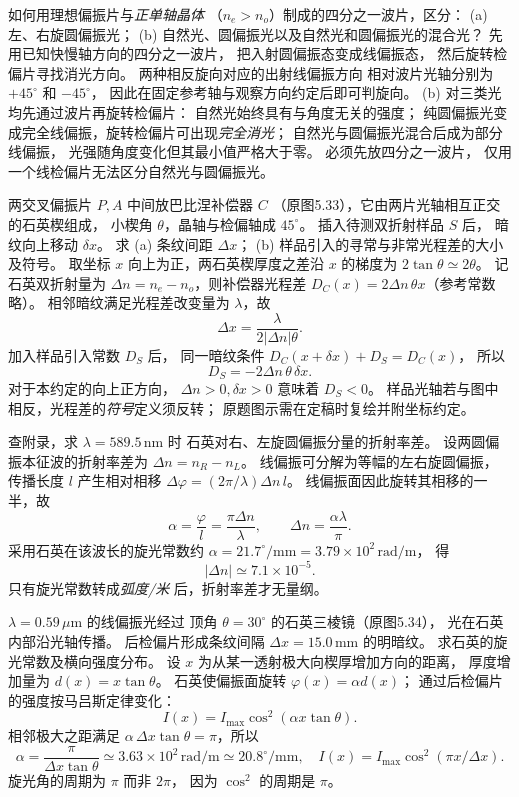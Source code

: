 如何用理想偏振片与\emph{正单轴晶体}
（$n_e>n_o$）制成的四分之一波片，区分：
(a) 左、右旋圆偏振光；
(b) 自然光、圆偏振光以及自然光和圆偏振光的混合光？
\exsolution
先用已知快慢轴方向的四分之一波片，
把入射圆偏振态变成线偏振态，
然后旋转检偏片寻找消光方向。
两种相反旋向对应的出射线偏振方向
相对波片光轴分别为 $+45^\circ$ 和 $-45^\circ$，
因此在固定参考轴与观察方向约定后即可判旋向。
(b) 对三类光均先通过波片再旋转检偏片：
自然光始终具有与角度无关的强度；
纯圆偏振光变成完全线偏振，旋转检偏片可出现\emph{完全消光}；
自然光与圆偏振光混合后成为部分线偏振，
光强随角度变化但其最小值严格大于零。
\excheck 必须先放四分之一波片，
仅用一个线检偏片无法区分自然光与圆偏振光。

两交叉偏振片 $P,A$ 中间放巴比涅补偿器 $C$
（原图5.33），它由两片光轴相互正交的石英楔组成，
小楔角 $\theta$，晶轴与检偏轴成 $45^\circ$。
插入待测双折射样品 $S$ 后，
暗纹向上移动 $\delta x$。
求 (a) 条纹间距 $\Delta x$；
(b) 样品引入的寻常与非常光程差的大小及符号。
\exsolution
取坐标 $x$ 向上为正，两石英楔厚度之差沿
$x$ 的梯度为 $2\tan\theta\simeq2\theta$。
记石英双折射量为
$\Delta n=n_e-n_o$，则补偿器光程差
$D_C(x)=2\Delta n\,\theta x$（参考常数略）。
相邻暗纹满足光程差改变量为 $\lambda$，故
\[
 \boxed{\Delta x=\frac{\lambda}{2|\Delta n|\theta}}.
\]
加入样品引入常数 $D_S$ 后，
同一暗纹条件
$D_C(x+\delta x)+D_S=D_C(x)$，
所以
\[
 \boxed{D_S=-2\Delta n\,\theta\,\delta x}.
\]
对于本约定的向上正方向，
$\Delta n>0,\delta x>0$ 意味着 $D_S<0$。
\excheck 样品光轴若与图中相反，光程差的\emph{符号}定义须反转；
原题图示需在定稿时复绘并附坐标约定。

查附录，求 $\lambda=589.5\,\mathrm{nm}$ 时
石英对右、左旋圆偏振分量的折射率差。
\exsolution
设两圆偏振本征波的折射率差为
$\Delta n=n_R-n_L$。
线偏振可分解为等幅的左右旋圆偏振，
传播长度 $l$ 产生相对相移
$\Delta\varphi=(2\pi/\lambda)\Delta n\,l$。
线偏振面因此旋转其相移的一半，故
\[
 \alpha=\frac{\varphi}{l}=\frac{\pi\Delta n}{\lambda},
 \qquad \boxed{\Delta n=\frac{\alpha\lambda}{\pi}}.
\]
采用石英在该波长的旋光常数约
$\alpha=21.7^\circ/\mathrm{mm}
 =3.79\times10^2\,\mathrm{rad/m}$，
得
\[
 \boxed{|\Delta n|\simeq7.1\times10^{-5}}.
\]
\excheck 只有旋光常数转成\emph{弧度/米}
后，折射率差才无量纲。

$\lambda=0.59\,\mu\mathrm m$ 的线偏振光经过
顶角 $\theta=30^\circ$ 的石英三棱镜（原图5.34），
光在石英内部沿光轴传播。
后检偏片形成条纹间隔
$\Delta x=15.0\,\mathrm{mm}$ 的明暗纹。
求石英的旋光常数及横向强度分布。
\exsolution
设 $x$ 为从某一透射极大向楔厚增加方向的距离，
厚度增加量为 $d(x)=x\tan\theta$。
石英使偏振面旋转
$\varphi(x)=\alpha d(x)$；
通过后检偏片的强度按马吕斯定律变化：
\[
 I(x)=I_{\max}\cos^2(\alpha x\tan\theta).
\]
相邻极大之距满足
$\alpha\,\Delta x\tan\theta=\pi$，所以
\[
 \boxed{\alpha=\frac{\pi}{\Delta x\tan\theta}
 \simeq3.63\times10^2\,\mathrm{rad/m}
 \simeq20.8^\circ/\mathrm{mm}},
 \quad
 \boxed{I(x)=I_{\max}\cos^2(\pi x/\Delta x)}.
\]
\excheck 旋光角的周期为 $\pi$ 而非 $2\pi$，
因为 $\cos^2$ 的周期是 $\pi$。

